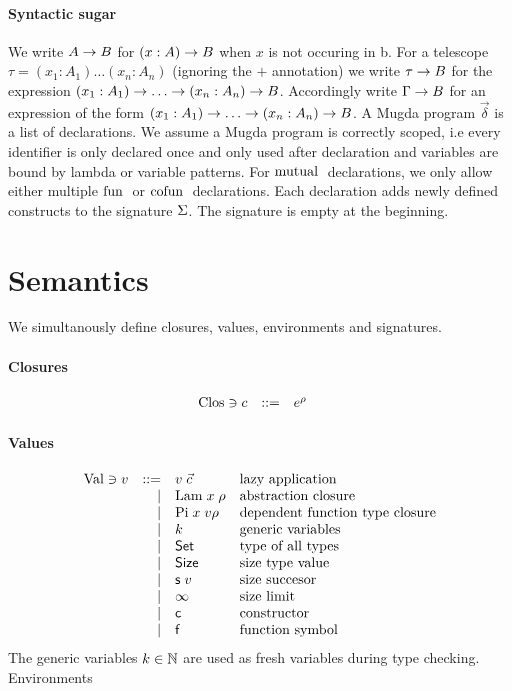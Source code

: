 \paragraph*{Syntactic sugar}
We write $A \rightarrow B$ for $( x : A ) \rightarrow{B}$ when $x$ is not occuring in b.
For a telescope $\tau = (x_1 : A_1) \ldots (x_n : A_n)$ (ignoring the $+$ annotation) we write
$\tau \rightarrow B$ for the expression  $( x_1 : A_1 ) \rightarrow{\ldots \rightarrow( x_n : A_n ) \rightarrow{B}}$.
Accordingly write $\Gamma \rightarrow B$ for an expression of the form $( x_1 : A_1 ) \rightarrow{\ldots \rightarrow( x_n : A_n ) \rightarrow{B}}$.
A Mugda program $\vec{\delta}$ is a list of declarations.
We assume a Mugda program is correctly scoped, i.e every identifier
is only declared once and only used after declaration and variables are bound by lambda or variable patterns.
For $\mathrm{mutual}\;$ declarations, we only allow either multiple $\mathrm{fun}\;$ or $\mathrm{cofun}\;$ declarations.
Each declaration adds newly defined constructs to the signature $\mathrm{\Sigma}$.
The signature is empty at the beginning.

\section{Semantics}
We simultanously define closures, values, environments and signatures.

\paragraph*{Closures}
\[
\begin{array}{lrll}
\mathrm{Clos} \ni c & ::= & e^{\rho} & 
\end{array}
\]

\paragraph*{Values}
\[
\begin{array}{lrll}
\mathrm{Val} \ni v & ::= & v \; \vec{c} & \mbox{lazy application}\\
& \mid & \mathrm{Lam} \; x \; \rho & \mbox{abstraction closure}\\
& \mid & \mathrm{Pi} \; x \; v \rho & \mbox{dependent function type closure}\\
& \mid & k & \mbox{generic variables}\\
& \mid & \mathsf{Set} & \mbox{type of all types} \\
& \mid & \mathsf{Size} & \mbox{size type value}\\
& \mid & \mathsf{s}\; v & \mbox{size succesor}\\
& \mid & \infty & \mbox{size limit}\\
& \mid & \mathsf{c} & \mbox{constructor}\\
& \mid & \mathsf{f} & \mbox{function symbol}\\
\end{array}
\]
The generic variables $k \in \mathbb{N} $ are used as fresh variables during type checking.
Environments
